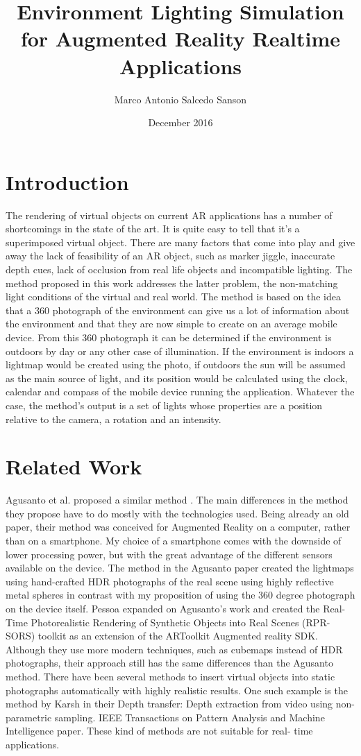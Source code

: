 \documentclass{article}
\title{Environment Lighting Simulation for Augmented Reality Realtime Applications}
\author{Marco Antonio Salcedo Sanson }
\date{December 2016}
\begin{document}
\maketitle

\section{Introduction}
The rendering of virtual objects on current AR applications has a number of shortcomings in the state of the art. It is quite easy to tell that it’s a superimposed virtual object. There are many factors that come into play and give away the lack of feasibility of an AR object, such as marker jiggle, inaccurate depth cues, lack of occlusion from real life objects and incompatible lighting.
The method proposed in this work addresses the latter problem, the non-matching light conditions of the virtual and real world. The method is based on the idea that a 360 photograph of the environment can give us a lot of information about the environment and that they are now simple to create on an average mobile device. From this 360 photograph it can be determined if the environment is outdoors by day or any other case of illumination. If the environment is indoors a lightmap would be created using the photo, if outdoors the sun will be assumed as the main source of light, and its position would be calculated using the clock, calendar and compass of the mobile device running the application. 
Whatever the case, the method's output is a set of lights whose properties are a position relative to the camera, a rotation and an intensity.

\section{Related Work}
Agusanto et al. proposed a similar method \cite{agusanto2003}. The main differences in the method they propose have to do mostly with the technologies used. Being already an old paper, their method was conceived for Augmented Reality on a computer, rather than on a smartphone. My choice of a smartphone comes with the downside of lower processing power, but with the great advantage of the different sensors available on the device. The method in the Agusanto paper created the lightmaps using hand-crafted HDR photographs of the real scene using highly reflective metal spheres in contrast with my proposition of using the 360 degree photograph on the device itself.
Pessoa\cite{pessoa2011} expanded on Agusanto's work and created the Real-Time Photorealistic Rendering of Synthetic Objects into Real Scenes (RPR-SORS) toolkit as an extension of the ARToolkit Augmented reality SDK. Although they use more modern techniques, such as cubemaps instead of HDR photographs, their approach still has the same differences than the Agusanto method.
There have been several methods to insert virtual objects into static photographs automatically with highly realistic results. One such example is the method by Karsh \cite{karsh2014} in their Depth transfer: Depth extraction from video using non-parametric sampling. IEEE Transactions on Pattern Analysis and Machine Intelligence paper. These kind of methods are not suitable for real- time applications.
\end{document}
